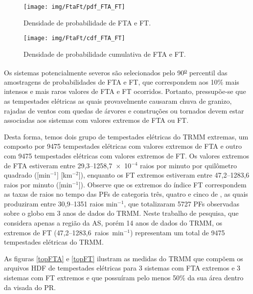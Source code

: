 \begin{figure}[!ht]
  \centering
  \texttt{[image: img/FtaFt/pdf\_FTA\_FT]}      
  \caption{Densidade de probabilidade de FTA e FT.} 
   \label{pdfFTAFT} 
\end{figure}

\begin{figure}[!hb]
  \centering 
  \texttt{[image: img/FtaFt/cdf\_FTA\_FT]} 
  \caption{Densidade de probabilidade cumulativa de FTA e FT.}
  \label{cdfFTAFT}
\end{figure}

Os sistemas potencialmente severos são selecionados pelo 90\textsuperscript{\underline{o}} percentil das amostragens de probabilidades de FTA e FT, que correspondem aos 10\% mais intensos e mais raros valores de FTA e FT ocorridos. Portanto, pressupõe-se que as tempestades elétricas as quais provavelmente causaram chuva de granizo, rajadas de ventos com quedas de árvores e construções ou tornados devem estar associadas aos sistemas com valores extremos de FTA ou FT.

Desta forma, temos dois grupo de tempestades elétricas do TRMM extremas, um composto por 9475 tempestades elétricas com valores extremos de FTA e outro com 9475 tempestades elétricas com valores extremos de FT. Os valores extremos de FTA estiveram entre 29,3--1258,7~$\times$~10$^{-4}$ raios por minuto por quilômetro quadrado ([min$^{-1}$] [km$^{-2}$]), enquanto os FT extremos estiveram entre {47,2--1283,6} raios por minuto ([min$^{-1}$]). Observe que os extremos do índice FT correspondem as taxas de raios no tempo das PFs de categoria três, quatro e cinco de , as quais produziram entre 30,9--1351 raios min$^{-1}$, que totalizaram 5727 PFs observadas sobre o globo em 3 anos de dados do TRMM. Neste trabalho de pesquisa, que considera apenas a região da AS, porém 14 anos de dados do TRMM, os extremos de FT ({47,2--1283,6}~raios~min$^{-1}$) representam um total de 9475 tempestades elétricas do TRMM.      


As figuras \ref{topFTA} e \ref{topFT} ilustram as medidas do TRMM que compõem os arquivos HDF de tempestades elétricas para 3 sistemas com FTA extremos e 3 sistemas com FT extremos  e que possuíram pelo menos 50\% da sua área dentro da visada do PR.

